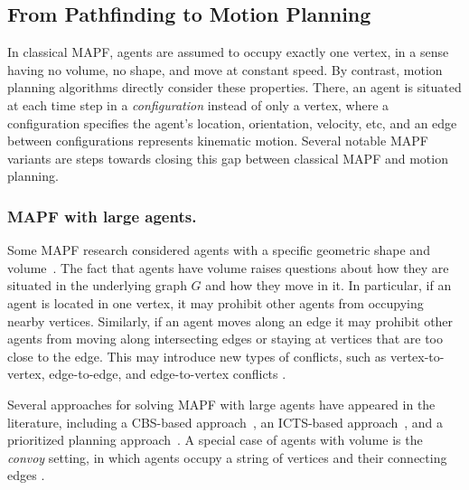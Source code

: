 \documentclass[letterpaper]{article} %
\newcommand{\mapf}{\ac{MAPF}\xspace}
\newcommand{\comment}[1]{{\nb{\textbf{Comment:}}{orange}{#1}}}
\begin{document}
\subsection{From Pathfinding to Motion Planning}
In classical MAPF, agents are assumed to occupy exactly one vertex, in a sense having no volume, no shape, and move at constant speed. By contrast, motion planning algorithms directly consider these  properties. There, an agent is situated at each time step in a \emph{configuration} instead of only a vertex, where a configuration specifies the agent's location, orientation, velocity, etc, and an edge between configurations represents kinematic motion. Several notable \mapf variants are steps towards closing this gap between classical \mapf and motion planning. %

\subsubsection{\mapf with large agents.}
Some \mapf research considered agents with a specific geometric shape and volume~\cite{li2019multi,walker2018extended,yakovlev2017any,thomas2015extended}. The fact that agents have volume raises questions about how they are situated in the underlying graph $G$ and how they move in it. In particular, if an agent is located in one vertex, it may prohibit other agents from occupying nearby vertices.
Similarly, if an agent moves along an edge it may prohibit other agents from moving along intersecting edges or staying at vertices that are too close to the edge. This may introduce new types of conflicts, such as vertex-to-vertex, edge-to-edge, and edge-to-vertex conflicts \cite{honig2018trajectory}.


Several approaches for solving \mapf with large agents have appeared in the literature, including a CBS-based approach~\cite{li2019multi}, an ICTS-based approach~\cite{walker2018extended}, and a prioritized planning approach~\cite{yakovlev2017any}. A special case of agents with volume is the \emph{convoy} setting, in which agents occupy a string of vertices and their connecting edges \cite{thomas2015extended}.
\end{document}
